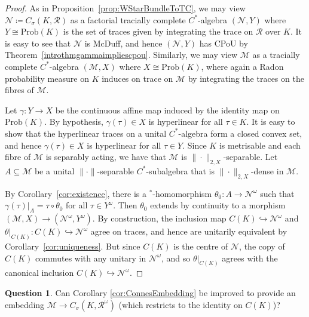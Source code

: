 \documentclass[a4paper,11pt]{amsart}
\theoremstyle{definition}
\newtheorem{question}[theorem]{Question}
\numberwithin{equation}{section}
\numberwithin{theorem}{section}
\newcommand{\M}{\mathcal{M}}
\begin{document}
\begin{proof}
	As in Proposition~\ref{prop:WStarBundleToTC}, we may view $\mathcal N \coloneqq C_\sigma(K, \mathcal R)$ as a factorial tracially complete $C^*$-algebra $(\mathcal N, Y)$ where $Y \cong \mathrm{Prob}(K)$ is the set of traces given by integrating the trace on $\mathcal R$ over $K$.  It is easy to see that $\mathcal N$ is McDuff, and hence $(\mathcal N, Y)$ has CPoU by Theorem~\ref{introthmgammaimpliescpou}.  Similarly, we may view $\mathcal M$ as a tracially complete $C^*$-algebra $(\mathcal M, X)$ where $X \cong \mathrm{Prob}(K)$, where again a Radon probability measure on $K$ induces on trace on $\mathcal M$ by integrating the traces on the fibres of $\mathcal M$.  
	
	Let $\gamma \colon Y \rightarrow X$ be the continuous affine map induced by the identity map on $\mathrm{Prob}(K)$.  By hypothesis, $\gamma(\tau) \in X$ is hyperlinear for all $\tau \in K$.  It is easy to show that the hyperlinear traces on a unital $C^*$-algebra form a closed convex set, and hence $\gamma(\tau) \in X$ is hyperlinear for all $\tau \in Y$. Since $K$ is metrisable and each fibre of $\mathcal M$ is separably acting, we have that $\mathcal M$ is $\|\cdot\|_{2, X}$-separable.  Let $A \subseteq \mathcal M$ be a unital  $\|\cdot\|$-separable $C^*$-subalgebra that is $\|\cdot\|_{2,X}$-dense in $\M$.  
	
	By Corollary~\ref{cor:existence}, there is a $^*$-homomorphism $\theta_0 \colon A \rightarrow \mathcal N^\omega$ such that $\gamma(\tau)|_A = \tau \circ \theta_0$ for all $\tau \in Y^\omega$.  Then $\theta_0$ extends by continuity to a morphism $(\mathcal M, X) \rightarrow (\mathcal N^\omega, Y^\omega)$.  By construction, the inclusion map $C(K) \hookrightarrow \mathcal N^\omega$ and $\theta|_{C(K)} \colon C(K) \hookrightarrow \mathcal N^\omega$ agree on traces, and hence are unitarily equivalent by Corollary~\ref{cor:uniqueness}. 
 But since $C(K)$ is the centre of $\mathcal N$, the copy of $C(K)$ commutes with any unitary in $\mathcal  N^\omega$, and so $\theta|_{C(K)}$ agrees with the canonical inclusion $C(K) \hookrightarrow \mathcal N^\omega$. 
\end{proof}

\begin{question}
    Can Corollary \ref{cor:ConnesEmbedding} be improved to provide an embedding $\M\to C_\sigma(K,\mathcal R^\omega)$ (which restricts to the identity on $C(K)$)?
\end{question}
 
\end{document}
